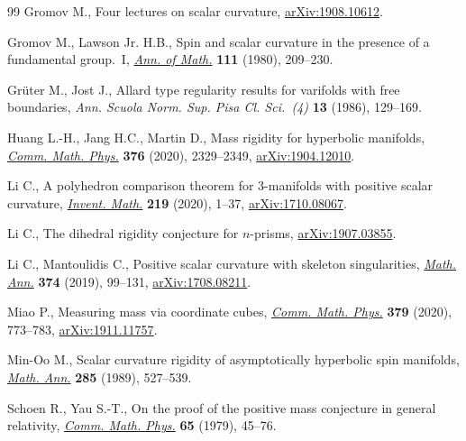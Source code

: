 \begin{thebibliography}{99}
Gromov M., Four lectures on scalar curvature, \href{https://arxiv.org/abs/1908.10612}{arXiv:1908.10612}.

Gromov M., Lawson Jr. H.B., Spin and scalar curvature in the presence of a
 fundamental group.~{I}, \href{https://doi.org/10.2307/1971198}{\textit{Ann. of Math.}} \textbf{111} (1980), 209--230.

Gr\"uter M., Jost J., Allard type regularity results for varifolds with free
 boundaries, \textit{Ann. Scuola Norm. Sup. Pisa Cl. Sci.~(4)} \textbf{13}
 (1986), 129--169.

Huang L.-H., Jang H.C., Martin D., Mass rigidity for hyperbolic manifolds,
 \href{https://doi.org/10.1007/s00220-019-03623-0}{\textit{Comm. Math. Phys.}} \textbf{376} (2020), 2329--2349,
 \href{https://arxiv.org/abs/1904.12010}{arXiv:1904.12010}.

Li C., A polyhedron comparison theorem for 3-manifolds with positive scalar
 curvature, \href{https://doi.org/10.1007/s00222-019-00895-0}{\textit{Invent. Math.}} \textbf{219} (2020), 1--37,
 \href{https://arxiv.org/abs/1710.08067}{arXiv:1710.08067}.

Li C., The dihedral rigidity conjecture for $n$-prisms, \href{https://arxiv.org/abs/1907.03855}{arXiv:1907.03855}.

Li C., Mantoulidis C., Positive scalar curvature with skeleton singularities,
 \href{https://doi.org/10.1007/s00208-018-1753-1}{\textit{Math. Ann.}} \textbf{374} (2019), 99--131, \href{https://arxiv.org/abs/1708.08211}{arXiv:1708.08211}.

Miao P., Measuring mass via coordinate cubes, \href{https://doi.org/10.1007/s00220-020-03811-3}{\textit{Comm. Math. Phys.}}
 \textbf{379} (2020), 773--783, \href{https://arxiv.org/abs/1911.11757}{arXiv:1911.11757}.

Min-Oo M., Scalar curvature rigidity of asymptotically hyperbolic spin
 manifolds, \href{https://doi.org/10.1007/BF01452046}{\textit{Math. Ann.}} \textbf{285} (1989), 527--539.

Schoen R., Yau S.-T., On the proof of the positive mass conjecture in general
 relativity, \href{https://doi.org/10.1007/BF01940959}{\textit{Comm. Math. Phys.}} \textbf{65} (1979), 45--76.


\end{thebibliography}
